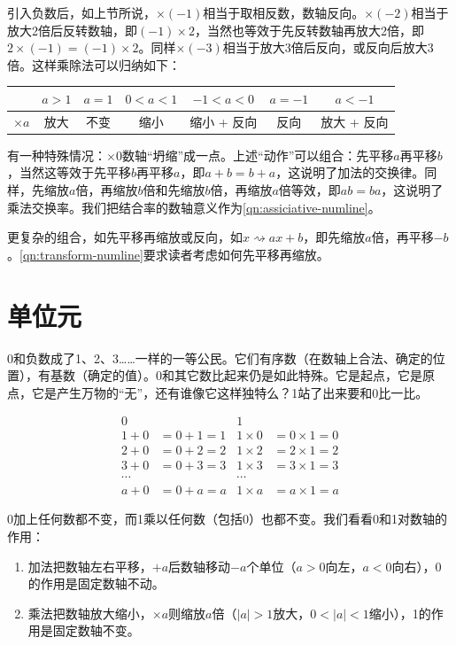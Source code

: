 \documentclass[b5paper]{ctexart}
\begin{document}
引入负数后，如上节所说，$\times (-1)$相当于取相反数，数轴反向。$\times (-2)$相当于放大2倍后反转数轴，即$(-1) \times 2$，当然也等效于先反转数轴再放大2倍，即$2 \times (-1) = (-1) \times 2$。同样$\times (-3)$相当于放大3倍后反向，或反向后放大3倍。这样乘除法可以归纳如下：

\begin{center}
  \begin{tabular}{c|c|c|c|c|c|c}
             & $a > 1$ & $a = 1$ & $0 < a < 1$  & $-1 < a < 0$ & $a = -1$ & $a < -1$ \\
  \hline
  $\times a$ & 放大     & 不变    & 缩小          & 缩小 + 反向 & 反向 & 放大 + 反向
  \end{tabular}
\end{center}

有一种特殊情况：$\times 0$数轴“坍缩”成一点。上述“动作”可以组合：先平移$a$再平移$b$，当然这等效于先平移$b$再平移$a$，即$a + b = b + a$，这说明了加法的交换律。同样，先缩放$a$倍，再缩放$b$倍和先缩放$b$倍，再缩放$a$倍等效，即$ab = ba$，这说明了乘法交换率。我们把结合率的数轴意义作为\cref{qn:assiciative-numline}。

更复杂的组合，如先平移再缩放或反向，如$x \rightsquigarrow ax + b$，即先缩放$a$倍，再平移$-b$。\cref{qn:transform-numline}要求读者考虑如何先平移再缩放。

\section{单位元}
 \label{sec:unit}
0和负数成了1、2、3……一样的一等公民。它们有序数（在数轴上合法、确定的位置），有基数（确定的值）。0和其它数比起来仍是如此特殊。它是起点，它是原点，它是产生万物的“无”，还有谁像它这样独特么？1站了出来要和0比一比。

\begin{align*}
  0     &             &  1 & \\
  1 + 0 & = 0 + 1 = 1  &  1 \times 0 &= 0 \times 1 = 0 \\
  2 + 0 &= 0 + 2 = 2  &  1 \times 2  &= 2 \times 1 = 2 \\
  3 + 0 &= 0 + 3 = 3  &  1 \times 3  &= 3 \times 1 = 3 \\
  \cdots &            & \cdots & \\
  a + 0 &= 0 + a = a  &  1 \times a  &= a \times 1 =  a
\end{align*}

0加上任何数都不变，而1乘以任何数（包括0）也都不变。我们看看0和1对数轴的作用：
\begin{enumerate}[1)]
\item 加法把数轴左右平移，$+a$后数轴移动$-a$个单位（$a > 0$向左，$a < 0$向右），0的作用是固定数轴不动。
\item 乘法把数轴放大缩小，$\times a$则缩放$a$倍（$|a| > 1$放大，$0 < |a| < 1$缩小），1的作用是固定数轴不变。
\end{enumerate}
\end{document}
